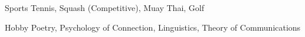 

\begin{cvskills}

  \cvskill
    {Sports} %
    {Tennis, Squash (Competitive), Muay Thai, Golf} %

  \cvskill
    {Hobby} %
    {Poetry, Psychology of Connection, Linguistics, Theory of Communications} %

\end{cvskills}
